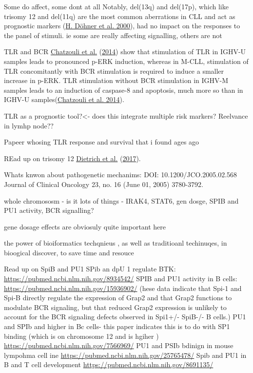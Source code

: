 \documentclass[11pt, a4paper, twosided]{book}
\begin{document}
Some do affect, some dont at all
Notably, del(13q) and del(17p), which like trisomy 12 and del(11q) are the most common aberrations in CLL and act as prognostic markers (\protect\hyperlink{ref-Dohner2000}{H. Döhner et al. 2000}), had no impact on the responses to the panel of stimuli.
ie some are really affecting signalling, others are not

TLR and BCR
\protect\hyperlink{ref-Chatzouli2014}{Chatzouli et al.} (\protect\hyperlink{ref-Chatzouli2014}{2014}) show that stimulation of TLR in IGHV-U samples leads to pronounced p-ERK induction, whereas in M-CLL, stimulation of TLR concomitantly with BCR stimulation is required to induce a smaller increase in p-ERK. TLR stimulation without BCR stimulation in IGHV-M samples leads to an induction of caspase-8 and apoptosis, much more so than in IGHV-U samples(\protect\hyperlink{ref-Chatzouli2014}{Chatzouli et al. 2014}).

TLR as a prognostic tool?\textless- does this integrate multiple risk markers?
Reelvance in lymhp node??

Papeer whosing TLR response and survival that i found ages ago

REad up on trisomy 12
\protect\hyperlink{ref-JCIpaper}{Dietrich et al.} (\protect\hyperlink{ref-JCIpaper}{2017}).

Whats knwon about pathogenetic mechanims:
DOI: 10.1200/JCO.2005.02.568 Journal of Clinical Oncology 23, no. 16 (June 01, 2005) 3780-3792.

whole chromososm - is it lots of things - IRAK4, STAT6, gen dosge, SPIB and PU1 activity, BCR signalling?

gene dosage effects are obviosuly quite important here

the power of bioiformatics techqnieus , as well as traditioanl techinuqes, in bioogical discover, to save time and resouce

Read up on SpiB and PU1
SPib an dpU 1 regulate BTK: \url{https://pubmed.ncbi.nlm.nih.gov/8934542/}
SPIB and PU1 activity in B cells: \url{https://pubmed.ncbi.nlm.nih.gov/15936902/}
(hese data indicate that Spi-1 and Spi-B directly regulate the expression of Grap2 and that Grap2 functions to modulate BCR signaling, but that reduced Grap2 expression is unlikely to account for the BCR signaling defects observed in Spi1+/- SpiB-/- B cells.)
PU1 and SPIb and higher in Bc cells- this paper indicates this is to do with SP1 binding (which is on chromosome 12 and is hgiher ) \url{https://pubmed.ncbi.nlm.nih.gov/7566969/}
PU1 and PSIb bdinign in mouse lympohma cell ine \url{https://pubmed.ncbi.nlm.nih.gov/25765478/}
Spib and PU1 in B and T cell development \url{https://pubmed.ncbi.nlm.nih.gov/8691135/}
\end{document}
